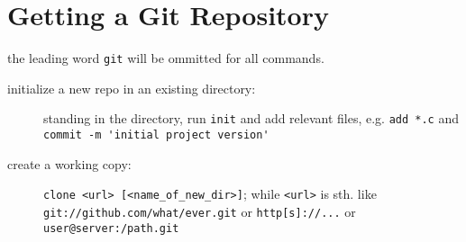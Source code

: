 \documentclass[a4paper,notumble]{leaflet} %
\begin{document}
\section{Getting a Git Repository}
the leading word \verb!git! will be ommitted for all commands.
\begin{description}
\item[initialize a new repo in an existing directory:] standing in the directory, run \verb!init! and add relevant files, e.g. \verb!add *.c! and \verb!commit -m 'initial project version'!
\item[create a working copy:] %
	\verb!clone <url> [<name_of_new_dir>]!; while \texttt{<url>} is sth. like \verb!git://github.com/what/ever.git! or \verb!http[s]://...! or \verb!user@server:/path.git!
\end{description}
\end{document}
